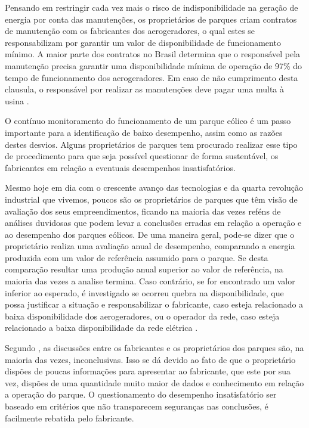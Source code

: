 Pensando em restringir cada vez mais o risco de indisponibilidade na geração de energia por conta das manutenções, os proprietários de parques criam contratos de manutenção com os fabricantes dos aerogeradores, o qual estes se responsabilizam por garantir um valor de disponibilidade de funcionamento mínimo. A maior parte dos contratos no Brasil determina que o responsável pela manutenção precisa garantir uma disponibilidade mínima de operação de 97\% do tempo de funcionamento dos aerogeradores. Em caso de não cumprimento desta clausula, o responsável por realizar as manutenções deve pagar uma multa à usina \cite{confiabilidade-aplicada-manutencao-preventiva}.

O contínuo monitoramento do funcionamento de um parque eólico é um passo importante para a identificação de baixo desempenho, assim como as razões destes desvios. Alguns proprietários de parques tem procurado realizar esse tipo de procedimento para que seja possível questionar de forma sustentável, os fabricantes em relação a eventuais desempenhos insatisfatórios.

Mesmo hoje em dia com o crescente avanço das tecnologias e da quarta revolução industrial que vivemos, poucos são os proprietários de parques que têm visão de avaliação dos seus empreendimentos, ficando na maioria das vezes reféns de análises duvidosas que podem levar a conclusões erradas em relação a operação e ao desempenho dos parques eólicos. De uma maneira geral, pode-se dizer que o proprietário realiza uma avaliação anual de desempenho, comparando a energia produzida com um valor de referência assumido para o parque. Se desta comparação resultar uma produção anual superior ao valor de referência, na maioria das vezes a analise termina. Caso contrário, se for encontrado um valor inferior ao esperado, é investigado se ocorreu quebra na disponibilidade, que possa justificar a situação e responsabilizar o fabricante, caso esteja relacionado a baixa disponibilidade dos aerogeradores, ou o operador da rede, caso esteja relacionado a baixa disponibilidade da rede elétrica \cite{metodologia-avaliacao-desempenho-de-parques}.

Segundo , as discussões entre os fabricantes e os proprietários dos parques são, na maioria das vezes, inconclusivas. Isso se dá devido ao fato de que o proprietário dispões de poucas informações para apresentar ao fabricante, que este por sua vez, dispões de uma quantidade muito maior de dados e conhecimento em relação a operação do parque. O questionamento do desempenho insatisfatório ser baseado em critérios que não transparecem seguranças nas conclusões, é facilmente rebatida pelo fabricante.

